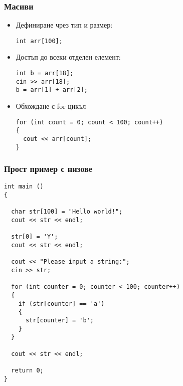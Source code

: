 \documentclass{beamer}
\begin{document}
\begin{frame}[fragile]
\frametitle{Масиви}

\begin{itemize}
  \item Дефиниране чрез тип и размер: 

\begin{lstlisting}
int arr[100];
\end{lstlisting}
\pause
  \item Достъп до всеки отделен елемент:

\begin{lstlisting}
int b = arr[18];
cin >> arr[18];
b = arr[1] + arr[2];
\end{lstlisting}
\pause

  \item Обхождане с for цикъл

\begin{lstlisting}
for (int count = 0; count < 100; count++)
{
  cout << arr[count];
}
\end{lstlisting}
\end{itemize}

\end{frame}


\begin{frame}[fragile]
\frametitle{Прост пример с низове}

\begin{flushleft}
\begin{lstlisting}
int main ()
{

  char str[100] = "Hello world!";
  cout << str << endl;

  str[0] = 'Y';
  cout << str << endl;

  cout << "Please input a string:";
  cin >> str;

  for (int counter = 0; counter < 100; counter++)
  {
    if (str[counter] == 'a')
    {
      str[counter] = 'b';
    }
  }

  cout << str << endl;

  return 0;
}
\end{lstlisting}
\end{flushleft}

\end{frame}
\end{document}
